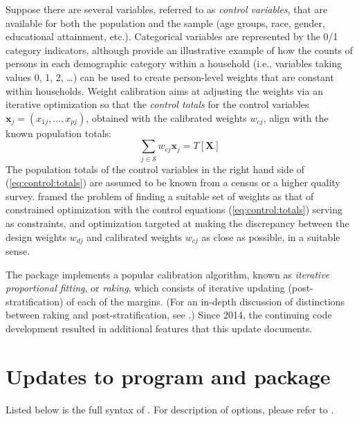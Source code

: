 Suppose there are several variables, referred to
as {\it control variables}, that are available for both
the population and the sample
(age groups, race, gender, educational attainment, etc.).
Categorical variables are represented by the 0/1 category indicators,
although \citet{kolenikov:hammer:2015} provide an illustrative example of how
the counts of persons in each demographic category within a household
(i.e., variables taking values 0, 1, 2, \ldots)
can be used to create person-level weights that are constant within households.
Weight calibration aims at adjusting the weights
via an iterative optimization
so that the {\it control totals} for the control variables
$\mathbf{x}_j=(x_{1j}, \ldots, x_{pj})$, obtained with the calibrated
weights $w_{cj}$, align with the known population totals:
\begin{equation}
    \sum_{j \in \mathcal{S}} w_{cj} \mathbf{x}_j
    = T [ \mathbf{X}  ]
    \label{eq:control:totals}
\end{equation}
The population totals of the control variables in the right hand side
of (\ref{eq:control:totals}) are assumed to be known from a census or a higher quality survey.
\citet{deville:sarndal:1992} framed the problem of finding a suitable
set of weights as that of constrained optimization with the control
equations (\ref{eq:control:totals}) serving as constraints,
and optimization targeted at making the discrepancy between
the design weights $w_{dj}$ and calibrated weights
$w_{cj}$ as close as possible, in a suitable sense.

The package  \citep{kolenikov:2014} implements
a popular calibration algorithm, known as \textit{iterative proportional fitting},
or \textit{raking}, which consists of iterative updating (post-stratification) of
each of the margins. (For an in-depth discussion of distinctions between
raking and post-stratification, see \citet{kolenikov:2016}.)
Since 2014, the continuing code development resulted
in additional features that this update documents.


\section{Updates to  program and package}

Listed below is the full syntax of . For description of options,
please refer to \citet{kolenikov:2014}.


